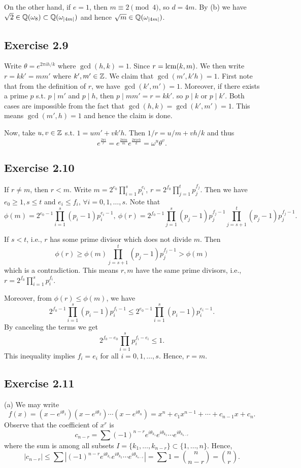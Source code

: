 \documentclass[../Marcus.tex]{subfiles}
\begin{document}
On the other hand, if $e=1$, then $m\equiv 2\pmod{4}$, so $d=4m$. By (b) we have $\sqrt{2}\in\mathbb{Q}(\omega_8)\subset\mathbb{Q}(\omega_{|4m|})$ and hence $\sqrt{m}\in\mathbb{Q}(\omega_{|4m|})$.
 
\subsection*{Exercise 2.9}

Write $\theta=e^{2\pi ih/k}$ where $\gcd(h,k)=1$. Since $r=\operatorname{lcm}(k,m)$. We then write $r=kk'=mm'$ where $k',m'\in\mathbb{Z}$. We claim that $\gcd(m',k'h)=1$. First note that from the definition of $r$, we have $\gcd(k',m')=1$. Moreover, if there exists a prime $p$ s.t. $p\mid m'$ and $p\mid h$, then $p\mid mm'=r=kk'$. so $p\mid k$ or $p\mid k'$. Both cases are impossible from the fact that $\gcd(h,k)=\gcd(k',m')=1$. This means $\gcd(m',h)=1$ and hence the claim is done.

Now, take $u,v\in\mathbb{Z}$ s.t. $1=um'+vk'h$. Then $1/r=u/m+vh/k$ and thus 
$$
e^{\frac{2\pi i}{r}}=e^{\frac{2\pi iu}{m}}e^{\frac{2\pi ivh}{k}}=\omega^u\theta^v.
$$

\subsection*{Exercise 2.10}

If $r\neq m$, then $r<m$. Write $m=2^{e_0}\prod_{i=1}^s p_i^{e_i}$, $r=2^{f_0}\prod_{j=1}^t p_j^{f_j}$. Then we have $e_0\geq 1,s\leq t$ and
$e_i\leq f_i$, $\forall i=0,1,\ldots,s$. Note that 
$$
\phi(m)=2^{e_0-1}\prod_{i=1}^s (p_i-1)p_i^{e_i-1},\ \phi(r)=2^{f_0-1}\prod_{j=1}^s (p_j-1)p_j^{f_j-1}\prod_{j=s+1}^t (p_j-1)p_j^{f_j-1}.
$$

If $s<t$, i.e., $r$ has some prime divisor which does not divide $m$. Then 
$$
\phi(r)\geq \phi(m)\prod_{j=s+1}^t (p_j-1)p_j^{f_j-1} > \phi(m)
$$ 
which is a contradiction. This means $r,m$ have the same prime divisors, i.e., $r=2^{f_0}\prod_{i=1}^s p_i^{f_i}$.

Moreover, from $\phi(r)\leq \phi(m)$, we have 
$$
2^{f_0-1}\prod_{i=1}^s (p_i-1)p_i^{f_i-1}\leq 2^{e_0-1}\prod_{i=1}^s (p_i-1)p_i^{e_i-1}.
$$ 
By canceling the terms we get 
$$
2^{f_0-e_0}\prod_{i=1}^s p_i^{f_i-e_i}\leq 1.
$$ 
This inequality implies $f_i=e_i$ for all $i=0,1,\ldots,s$. Hence, $r=m$.
\subsection*{Exercise 2.11}

(a) We may write 
$$
f(x)=(x-e^{i\theta_1})(x-e^{i\theta_2})\cdots(x-e^{i\theta_n})=x^n+c_1x^{n-1}+\cdots+c_{n-1}x+c_n.
$$ 
Observe that the coefficient of $x^r$ is 
$$
c_{n-r}=\sum (-1)^{n-r}e^{i\theta_{k_1}}e^{i\theta_{k_2}}\cdots e^{i\theta_{k_{n-r}}}
$$ 
where the sum is among all subsets $I=\{k_1,\ldots,k_{n-r}\} \subset \{1,\ldots,n\}$. Hence, 
$$
|c_{n-r}|\leq \sum \left|(-1)^{n-r}e^{i\theta_{k_1}}e^{i\theta_{k_2}}\cdots e^{i\theta_{k_{n-r}}}\right| =\sum 1=\binom{n}{n-r}=\binom{n}{r}.
$$
\end{document}
